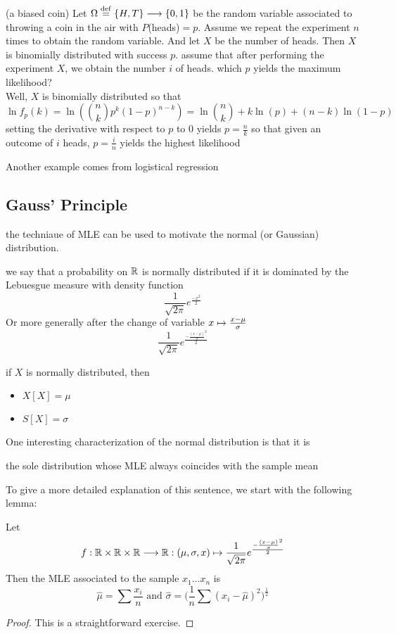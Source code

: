 \begin{example} (a biased coin)
Let $\Omega\stackrel{\operatorname{def}}{=}\{H,T\}\longrightarrow\{0,1\}$ be the random variable associated to throwing a coin in the air with $P$(heads)$=p$. Assume we repeat the experiment $n$ times to obtain the random variable. And let $X$ be the number of heads. Then $X$ is binomially distributed with success $p$. assume that after performing the experiment $X$, we obtain the number $i$ of heads. which $p$ yields the maximum likelihood?\\
Well, $X$ is binomially distributed so that
\[
\ln f_p(k)=\ln(\binom{n}{k}p^k(1-p)^{n-k})=\ln\binom{n}{k}+k\ln(p)+(n-k)\ln(1-p) 
\]
setting the derivative with respect to $p$ to $0$ yields $p=\frac{n}{k}$ so that given an outcome of $i$ heads, $p=\frac{i}{n}$ yields the highest likelihood
\end{example}

\begin{example}
Another example comes from logistical regression	
\end{example}

\subsection{Gauss' Principle} the techniaue of MLE can be used to motivate the normal (or Gaussian) distribution.
\begin{definition}
we say that a probability on $\mathbb{R}$ is normally distributed if it is dominated by the Lebuesgue measure with density function
\[
\frac{1}{\sqrt{2\pi}}e^{\frac{-x^2}{2}}
\]
Or more generally after the change of variable $x\mapsto \frac{x-\mu}{\sigma}$
\[
\frac{1}{\sqrt{2\pi}}e^{\frac{-\frac{(x-\mu)}{\sigma}^2}{2}}
\]
\end{definition}
\begin{lemma}
if $X$ is normally distributed, then
\begin{itemize}
\item $X[X]=\mu$
\item $S[X]=\sigma$	
\end{itemize}

\end{lemma}

One interesting characterization of the normal distribution is that it is \begin{center}
the sole distribution whose MLE always coincides with the sample mean\end{center}
To give a more detailed explanation of this sentence, we start with the following lemma:
\begin{lemma}
Let
\[
f:\mathbb{R}\times \mathbb{R}\times \mathbb{R}\longrightarrow \mathbb{R}:(\mu,\sigma,x)\mapsto \frac{1}{\sqrt{2\pi}}e^{\frac{-\frac{(x-\mu)}{\sigma}^2}{2}}
\]	
Then the MLE associated to the sample $x_1\ldots x_n$ is
\[
\hat{\mu}=\sum \frac{x_i}{n}\textrm{ and }\hat{\sigma}=\big(\frac{1}{n}\sum(x_i-\hat{\mu})^2)^\frac{1}{2}
\]
\end{lemma}
\begin{proof}
This is a straightforward exercise.	
\end{proof}
